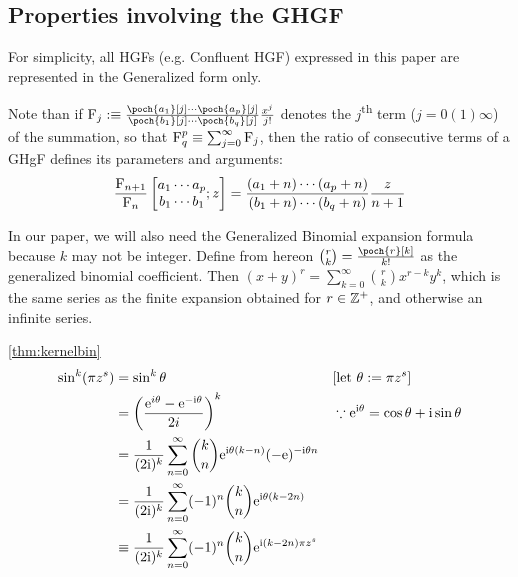 \subsection{Properties involving the GHGF} \label{subsec:app-prop_ghgf}
\begin{rmk} \label{rmk:ghgf}
    For simplicity, all HGFs (e.g. Confluent HGF) expressed in this paper are represented in the Generalized form only.

    Note than if $\Fhyp_j :\equiv \frac{\poch{a_1}[j] \cdots \poch{a_p}[j]}{\poch{b_1}[j] \cdots \poch{b_q}[j]} \frac{x^j}{j!}$ denotes the $j$\textsuperscript{th} term ($j = 0(1)\infty$) of the summation, so that $\operatorname{F}^p_q \equiv \sum_{j=0}^\infty \operatorname{F}_j$, then the ratio of consecutive terms of a GHgF defines its parameters and arguments:
    \[ \frac{\operatorname{F}_{n+1}}{\operatorname{F}_n} \left[ \begin{matrix} a_1 \cdots a_p \\ b_1 \cdots b_1 \end{matrix}; z \right] = \frac{(a_1 + n) \cdots (a_p +n)}{(b_1 +n)\cdots(b_q +n)} \frac{z}{n+1} \] \label{eq:hgfratio}

    In our paper, we will also need the Generalized Binomial expansion formula because $k$ may not be integer. Define from hereon ${r \choose k} = {\poch{r}[k] \over k!}$ as the generalized binomial coefficient. Then $(x+y)^r = \sum_{k=0}^\infty {r \choose k} x^{r-k} y^k$, which is the same series as the finite expansion obtained for $r \in \mathbb Z^+$, and otherwise an infinite series.
\end{rmk}

\begin{proofof}{\autoref{thm:kernelbin}}
    \begin{align*}
        \sin^k(\pi z^s) &= \sin^k \theta &&\text{[let $\theta:= \pi z^s$]}\\
        &= \left( \frac{\mathrm e^{i\theta} - \mathrm e^{-\mathrm i\theta}}{2i} \right)^k  && \because \mathrm e^{\mathrm i \theta} = \cos \theta + \mathrm i \sin \theta\\
        &= \frac{1}{(2\mathrm i)^k} \sum_{n=0}^\infty {k \choose n} \mathrm e^{\mathrm i \theta (k-n)} (-\mathrm e)^{-\mathrm i \theta n}\\
        &= \frac{1}{(2\mathrm i)^k} \sum_{n=0}^\infty (-1)^n {k \choose n} \mathrm e^{\mathrm i \theta (k-2n)}\\
        &\equiv \frac{1}{(2\mathrm i)^k} \sum_{n=0}^\infty (-1)^n {k \choose n} \mathrm e^{\mathrm i (k-2n) \pi z^s}
    \end{align*}
\end{proofof}

